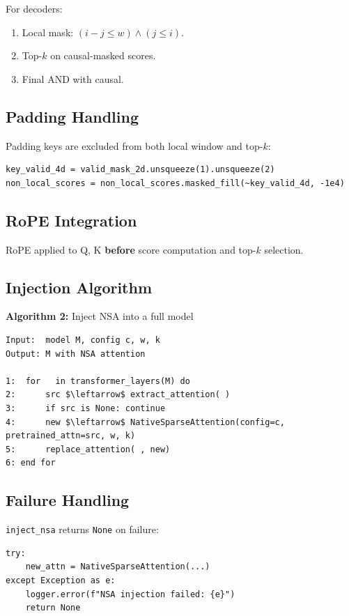 For decoders:
\begin{enumerate}
\item Local mask: $(i - j \leq w) \land (j \leq i)$.
\item Top-$k$ on causal-masked scores.
\item Final AND with causal.

\end{enumerate}
\subsection{Padding Handling}

Padding keys are excluded from both local window and top-$k$:

\begin{lstlisting}
key_valid_4d = valid_mask_2d.unsqueeze(1).unsqueeze(2)
non_local_scores = non_local_scores.masked_fill(~key_valid_4d, -1e4)
\end{lstlisting}

\subsection{RoPE Integration}

RoPE applied to Q, K \textbf{before} score computation and top-$k$ selection.

\subsection{Injection Algorithm}

\textbf{Algorithm 2:} Inject NSA into a full model
\begin{lstlisting}
Input:  model M, config c, w, k
Output: M with NSA attention

1:  for   in transformer_layers(M) do
2:      src $\leftarrow$ extract_attention( )
3:      if src is None: continue
4:      new $\leftarrow$ NativeSparseAttention(config=c, pretrained_attn=src, w, k)
5:      replace_attention( , new)
6: end for
\end{lstlisting}

\subsection{Failure Handling}

\texttt{inject\_nsa} returns \texttt{None} on failure:

\begin{lstlisting}
try:
    new_attn = NativeSparseAttention(...)
except Exception as e:
    logger.error(f"NSA injection failed: {e}")
    return None
\end{lstlisting}

